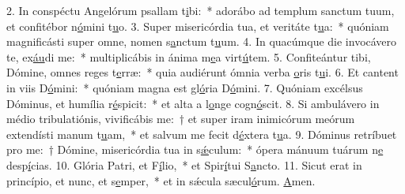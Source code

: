 2. In conspéctu Angelórum psallam t\uline{i}bi:~* adorábo ad templum sanctum tuum, et confitébor n\uline{ó}mini t\uline{u}o.
3. Super misericórdia tua, et veritáte t\uline{u}a:~* quóniam magnificásti super omne, nomen s\uline{a}nctum t\uline{u}um.
4. In quacúmque die invocávero te, ex\uline{áu}di me:~* multiplicábis in ánima m\uline{e}a virt\uline{ú}tem.
5. Confiteántur tibi, Dómine, omnes reges t\uline{e}rræ:~* quia audiérunt ómnia verba \uline{o}ris t\uline{u}i.
6. Et cantent in viis D\uline{ó}mini:~* quóniam magna est gl\uline{ó}ria D\uline{ó}mini.
7. Quóniam excélsus Dóminus, et humília r\uline{é}spicit:~* et alta a l\uline{o}nge cogn\uline{ó}scit.
8. Si ambulávero in médio tribulatiónis, vivificábis me:~† et super iram inimicórum meórum extendísti manum t\uline{u}am,~* et salvum me fecit d\uline{é}xtera t\uline{u}a.
9. Dóminus retríbuet pro me:~† Dómine, misericórdia tua in s\uline{ǽ}culum:~* ópera mánuum tuárum n\uline{e} desp\uline{í}cias.
10. Glória Patri, et F\uline{í}lio,~* et Spir\uline{í}tui S\uline{a}ncto.
11. Sicut erat in princípio, et nunc, et s\uline{e}mper,~* et in sǽcula sæcul\uline{ó}rum. \uline{A}men.
